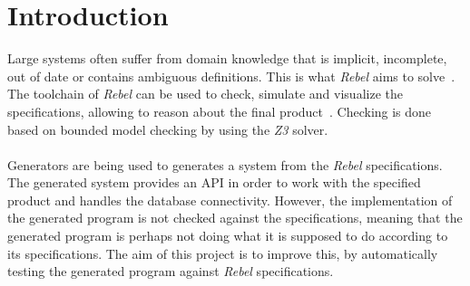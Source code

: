 \chapter{Introduction}
\label{chp:intro}
Large systems often suffer from domain knowledge that is implicit, incomplete,
out of date or contains ambiguous definitions. This is what \textit{Rebel} aims
to solve~\cite{stoel2016solving}. The toolchain of \textit{Rebel} can be used to
check, simulate and visualize the specifications, allowing to reason about the
final product~\cite{stoelcase}. Checking is done based on bounded model checking
by using the \textit{Z3} solver.\\
\\
Generators are being used to generates a system from the \textit{Rebel}
specifications. The generated system provides an API in order to work with the
specified product and handles the database connectivity. However, the
implementation of the generated program is not checked against the
specifications, meaning that the generated program is perhaps not doing what it
is supposed to do according to its specifications. The aim of this project is to
improve this, by automatically testing the generated program against
\textit{Rebel} specifications.


